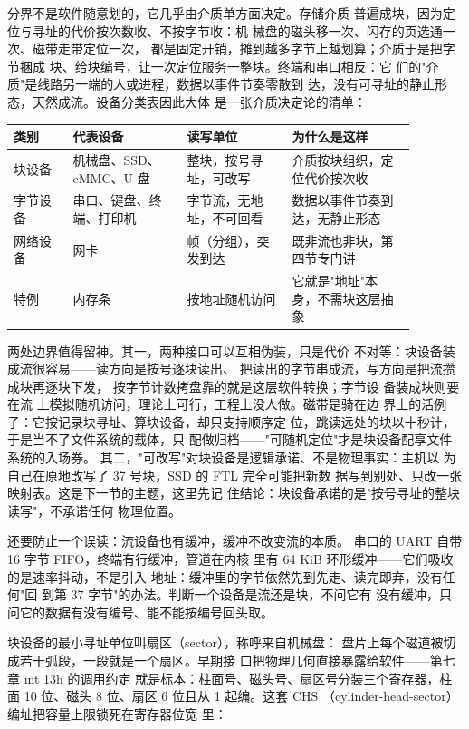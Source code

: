 分界不是软件随意划的，它几乎由介质单方面决定。存储介质
普遍成块，因为定位与寻址的代价按次数收、不按字节收：机
械盘的磁头移一次、闪存的页选通一次、磁带走带定位一次，
都是固定开销，摊到越多字节上越划算；介质于是把字节捆成
块、给块编号，让一次定位服务一整块。终端和串口相反：它
们的"介质"是线路另一端的人或进程，数据以事件节奏零散到
达，没有可寻址的静止形态，天然成流。设备分类表因此大体
是一张介质决定论的清单：

\begin{longtable}{L{0.13\linewidth}L{0.25\linewidth}L{0.23\linewidth}L{0.27\linewidth}}
\toprule
类别 & 代表设备 & 读写单位 & 为什么是这样 \\
\midrule
块设备 & 机械盘、SSD、eMMC、U 盘 & 整块，按号寻址，可改写 & 介质按块组织，定位代价按次收 \\
字节设备 & 串口、键盘、终端、打印机 & 字节流，无地址，不可回看 & 数据以事件节奏到达，无静止形态 \\
网络设备 & 网卡 & 帧（分组），突发到达 & 既非流也非块，第四节专门讲 \\
特例 & 内存条 & 按地址随机访问 & 它就是"地址"本身，不需块这层抽象 \\
\bottomrule
\end{longtable}

两处边界值得留神。其一，两种接口可以互相伪装，只是代价
不对等：块设备装成流很容易——读方向是按号逐块读出、
把读出的字节串成流，写方向是把流攒成块再逐块下发，
 按字节计数拷盘靠的就是这层软件转换；字节设
备装成块则要在流
上模拟随机访问，理论上可行，工程上没人做。磁带是骑在边
界上的活例子：它按记录块寻址、算块设备，却只支持顺序定
位，跳读远处的块以十秒计，于是当不了文件系统的载体，只
配做归档——"可随机定位"才是块设备配享文件系统的入场券。
其二，"可改写"对块设备是逻辑承诺、不是物理事实：主机以
为自己在原地改写了 37 号块，SSD 的 FTL 完全可能把新数
据写到别处、只改一张映射表。这是下一节的主题，这里先记
住结论：块设备承诺的是"按号寻址的整块读写"，不承诺任何
物理位置。

还要防止一个误读：流设备也有缓冲，缓冲不改变流的本质。
串口的 UART 自带 16 字节 FIFO，终端有行缓冲，管道在内核
里有 64 KiB 环形缓冲——它们吸收的是速率抖动，不是引入
地址：缓冲里的字节依然先到先走、读完即弃，没有任何"回
到第 37 字节"的办法。判断一个设备是流还是块，不问它有
没有缓冲，只问它的数据有没有编号、能不能按编号回头取。

块设备的最小寻址单位叫扇区（sector），称呼来自机械盘：
盘片上每个磁道被切成若干弧段，一段就是一个扇区。早期接
口把物理几何直接暴露给软件——第七章 int 13h 的调用约定
就是标本：柱面号、磁头号、扇区号分装三个寄存器，柱面
10 位、磁头 8 位、扇区 6 位且从 1 起编。这套 CHS
（cylinder-head-sector）编址把容量上限锁死在寄存器位宽
里：

